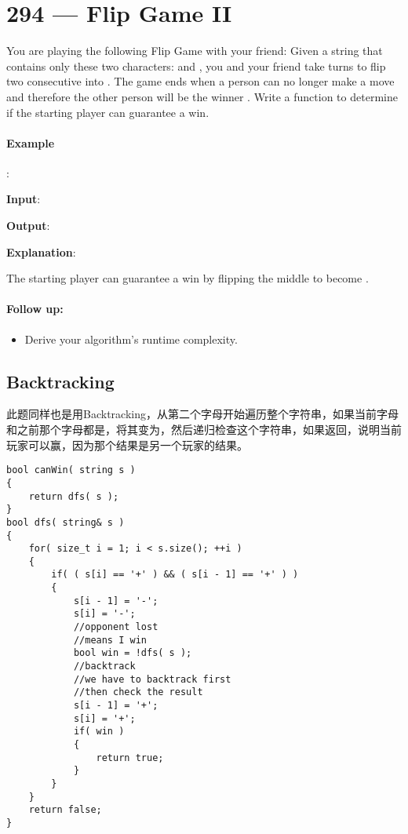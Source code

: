 \section{294 --- Flip Game II}
You are playing the following Flip Game with your friend: Given a string that contains only these two characters:  and , you and your friend take turns to flip two consecutive  into . The game ends when a person can no longer make a move and therefore the other person will be the winner
.
Write a function to determine if the starting player can guarantee a win.

\paragraph{Example}:

\begin{flushleft}
\textbf{Input}: 

\textbf{Output}:  

\textbf{Explanation}:

The starting player can guarantee a win by flipping the middle  to become .
\end{flushleft}

\paragraph{Follow up:}
\begin{itemize}
\item Derive your algorithm's runtime complexity.
\end{itemize}
\subsection{Backtracking}
此题同样也是用Backtracking，从第二个字母开始遍历整个字符串，如果当前字母和之前那个字母都是，将其变为，然后递归检查这个字符串，如果返回，说明当前玩家可以赢，因为那个结果是另一个玩家的结果。
\setcounter{lstlisting}{0}
\begin{lstlisting}[style=customc, caption={Backtracking}]
bool canWin( string s )
{
    return dfs( s );
}
bool dfs( string& s )
{
    for( size_t i = 1; i < s.size(); ++i )
    {
        if( ( s[i] == '+' ) && ( s[i - 1] == '+' ) )
        {
            s[i - 1] = '-';
            s[i] = '-';
            //opponent lost
            //means I win
            bool win = !dfs( s );
            //backtrack
            //we have to backtrack first
            //then check the result
            s[i - 1] = '+';
            s[i] = '+';
            if( win )
            {
                return true;
            }
        }
    }
    return false;
}

\end{lstlisting}


